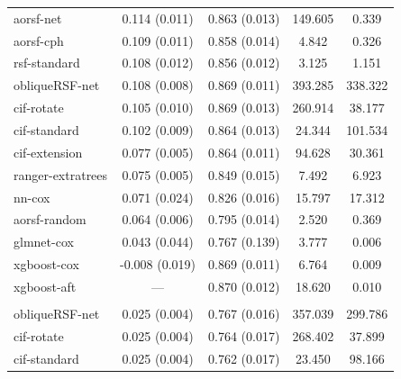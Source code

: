 \documentclass{article}\usepackage[]{graphicx}\usepackage[]{xcolor}
\newenvironment{knitrout}{}{} %
\begin{document}
\begin{knitrout}
\begin{longtable}[t]{lcccc}
\hspace{1em}aorsf-net & 0.114 (0.011) & 0.863 (0.013) & 149.605 & 0.339\\
\hspace{1em}aorsf-cph & 0.109 (0.011) & 0.858 (0.014) & 4.842 & 0.326\\
\hspace{1em}rsf-standard & 0.108 (0.012) & 0.856 (0.012) & 3.125 & 1.151\\
\hspace{1em}obliqueRSF-net & 0.108 (0.008) & 0.869 (0.011) & 393.285 & 338.322\\
\hspace{1em}cif-rotate & 0.105 (0.010) & 0.869 (0.013) & 260.914 & 38.177\\
\hspace{1em}cif-standard & 0.102 (0.009) & 0.864 (0.013) & 24.344 & 101.534\\
\hspace{1em}cif-extension & 0.077 (0.005) & 0.864 (0.011) & 94.628 & 30.361\\
\hspace{1em}ranger-extratrees & 0.075 (0.005) & 0.849 (0.015) & 7.492 & 6.923\\
\hspace{1em}nn-cox & 0.071 (0.024) & 0.826 (0.016) & 15.797 & 17.312\\
\hspace{1em}aorsf-random & 0.064 (0.006) & 0.795 (0.014) & 2.520 & 0.369\\
\hspace{1em}glmnet-cox & 0.043 (0.044) & 0.767 (0.139) & 3.777 & 0.006\\
\hspace{1em}xgboost-cox & -0.008 (0.019) & 0.869 (0.011) & 6.764 & 0.009\\
\hspace{1em}xgboost-aft & --- & 0.870 (0.012) & 18.620 & 0.010\\
\addlinespace[0.3em]
\multicolumn{5}{l}{\textit{\textbf{MESA; stroke, n = 6783, p = 48}}}\\
\hline
\hspace{1em}obliqueRSF-net & 0.025 (0.004) & 0.767 (0.016) & 357.039 & 299.786\\
\hspace{1em}cif-rotate & 0.025 (0.004) & 0.764 (0.017) & 268.402 & 37.899\\
\hspace{1em}cif-standard & 0.025 (0.004) & 0.762 (0.017) & 23.450 & 98.166\\

\end{longtable}
\end{knitrout}
\end{document}

